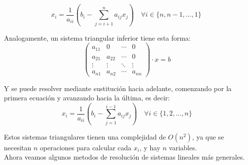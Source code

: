 \[
    x_i = 
    \frac{1}{a_{ii}} \left( b_i - \sum_{j=i+1}^n a_{ij} x_j \right) 
    \quad \forall i \in \{n, n-1, \ldots, 1\} \
\]

Analogamente, un sistema triangular inferior tiene esta forma: 
\[ 
    \begin{pmatrix} a_{11} & 0 & \cdots & 0 \\ a_{21} & a_{22} & \cdots & 0 \\ \vdots & \vdots & \ddots & \vdots \\ a_{n1} & a_{n2} & \cdots & a_{nn} 
    \end{pmatrix} 
    \cdot x = b 
\] 

Y se puede resolver mediante sustitución hacia adelante, comenzando por la primera ecuación y avanzando hacia la última, es decir: 
\[ 
x_i = \frac{1}{a_{ii}} \left( b_i - \sum_{j=1}^{i-1} a_{ij} x_j \right) 
\quad \forall i \in \{1, 2, \ldots, n\}
\]

Estos sistemas triangulares tienen una complejidad de $O(n^2)$, ya que se necesitan $n$ operaciones para calcular cada $x_i$, y hay $n$ variables.\\

Ahora veamos algunos metodos de resolución de sistemas lineales más generales.

